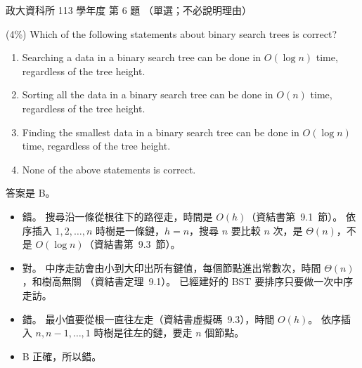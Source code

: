 \begin{pastexam}[label={px:nccu-113-dsa-06}]{政大資科所 113 學年度 第 6 題}
（單選；不必說明理由）

(4\%) Which of the following statements about binary search trees is correct?
\begin{enumerate}[label=\Alph*.]
\item Searching a data in a binary search tree can be done in $O(\log n)$ time, regardless of the tree
height.
\item Sorting all the data in a binary search tree can be done in $O(n)$ time, regardless of the tree height.
\item Finding the smallest data in a binary search tree can be done in $O(\log n)$ time, regardless of the
tree height.
\item None of the above statements is correct.
\end{enumerate}
\end{pastexam}

\begin{pastsoln}
答案是 B。
\begin{itemize}
\item[A.] 錯。 搜尋沿一條從根往下的路徑走，時間是 $O(h)$（資結書第~9.1~節）。 依序插入
$1, 2, \ldots, n$ 時樹是一條鏈，$h = n$，搜尋 $n$ 要比較 $n$ 次，是 $\Theta(n)$，不是
$O(\log n)$（資結書第~9.3~節）。
\item[B.] 對。 中序走訪會由小到大印出所有鍵值，每個節點進出常數次，時間 $\Theta(n)$，和樹高無關
（資結書定理~9.1）。 已經建好的 BST 要排序只要做一次中序走訪。
\item[C.] 錯。 最小值要從根一直往左走（資結書虛擬碼~9.3），時間 $O(h)$。 依序插入
$n, n - 1, \ldots, 1$ 時樹是往左的鏈，要走 $n$ 個節點。
\item[D.] B 正確，所以錯。
\end{itemize}
\end{pastsoln}
